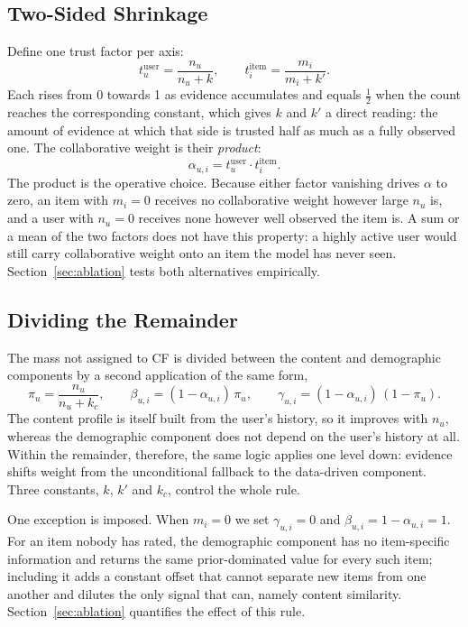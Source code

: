 \documentclass[runningheads]{llncs}
\begin{document}
\subsection{Two-Sided Shrinkage}

Define one trust factor per axis:
\begin{equation}
  t^{\mathrm{user}}_u = \frac{n_u}{n_u + k}, \qquad
  t^{\mathrm{item}}_i = \frac{m_i}{m_i + k'} .
  \label{eq:trust}
\end{equation}
Each rises from 0 towards 1 as evidence accumulates and equals $\tfrac{1}{2}$ when the count reaches the corresponding constant, which gives $k$ and $k'$ a direct reading: the amount of evidence at which that side is trusted half as much as a fully observed one. The collaborative weight is their \emph{product}:
\begin{equation}
  \alpha_{u,i} = t^{\mathrm{user}}_u \cdot t^{\mathrm{item}}_i .
  \label{eq:alpha}
\end{equation}
The product is the operative choice. Because either factor vanishing drives $\alpha$ to zero, an item with $m_i = 0$ receives no collaborative weight however large $n_u$ is, and a user with $n_u = 0$ receives none however well observed the item is. A sum or a mean of the two factors does not have this property: a highly active user would still carry collaborative weight onto an item the model has never seen. Section~\ref{sec:ablation} tests both alternatives empirically.

\subsection{Dividing the Remainder}

The mass not assigned to CF is divided between the content and demographic components by a second application of the same form,
\begin{equation}
  \pi_u = \frac{n_u}{n_u + k_c}, \qquad
  \beta_{u,i} = (1-\alpha_{u,i})\,\pi_u, \qquad
  \gamma_{u,i} = (1-\alpha_{u,i})\,(1-\pi_u).
  \label{eq:beta}
\end{equation}
The content profile is itself built from the user's history, so it improves with $n_u$, whereas the demographic component does not depend on the user's history at all. Within the remainder, therefore, the same logic applies one level down: evidence shifts weight from the unconditional fallback to the data-driven component. Three constants, $k$, $k'$ and $k_c$, control the whole rule.

One exception is imposed. When $m_i = 0$ we set $\gamma_{u,i} = 0$ and $\beta_{u,i} = 1 - \alpha_{u,i} = 1$. For an item nobody has rated, the demographic component has no item-specific information and returns the same prior-dominated value for every such item; including it adds a constant offset that cannot separate new items from one another and dilutes the only signal that can, namely content similarity. Section~\ref{sec:ablation} quantifies the effect of this rule.
\end{document}
